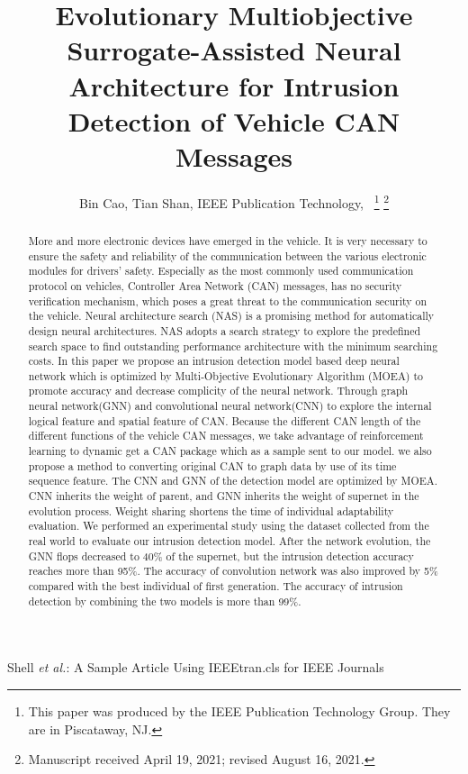 \documentclass[lettersize,journal]{IEEEtran}
\begin{document}
\title{Evolutionary Multiobjective Surrogate-Assisted Neural Architecture for Intrusion Detection of Vehicle CAN Messages}

\author{Bin Cao, Tian Shan, IEEE Publication Technology,~
\thanks{This paper was produced by the IEEE Publication Technology Group. They are in Piscataway, NJ.}%
\thanks{Manuscript received April 19, 2021; revised August 16, 2021.}}

%
{Shell \MakeLowercase{\textit{et al.}}: A Sample Article Using IEEEtran.cls for IEEE Journals}


\maketitle

\begin{abstract}
More and more electronic devices have emerged in the vehicle. It is very necessary to ensure the safety and reliability of the communication between the various electronic modules for drivers’ safety. Especially as the most commonly used communication protocol on vehicles, Controller Area Network (CAN) messages, has no security verification mechanism, which poses a great threat to the communication security on the vehicle. Neural architecture search (NAS) is a promising method for automatically design neural architectures. NAS adopts a search strategy to explore the predeﬁned search space to ﬁnd outstanding performance architecture with the minimum searching costs. In this paper we propose an intrusion detection model based deep neural network which is optimized by Multi-Objective Evolutionary Algorithm (MOEA) to promote accuracy and decrease complicity of the neural network. Through graph neural network(GNN) and convolutional neural network(CNN) to explore the internal logical feature and spatial feature of CAN. Because the different CAN length of the different functions of the vehicle CAN messages, we take advantage of reinforcement learning to dynamic get a CAN package which as a sample sent to our model. we also propose a method to converting original CAN to graph data by use of its time sequence feature. The CNN and GNN of the detection model are optimized by MOEA. CNN inherits the weight of parent, and GNN inherits the weight of supernet in the evolution process. Weight sharing shortens the time of individual adaptability evaluation. We performed an experimental study using the dataset collected from  the real world to evaluate our intrusion detection model. After the network evolution, the GNN flops decreased to 40\% of the supernet, but the intrusion detection accuracy reaches more than 95\%. The accuracy of convolution network was also improved by 5\% compared with the best individual of first generation. The accuracy of intrusion detection by combining the two models is more than 99\%.
\end{abstract}
\end{document}

